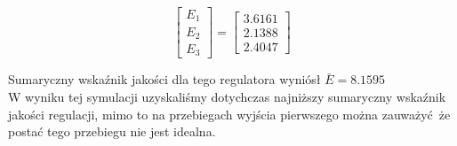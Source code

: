 \[
\begin{bmatrix}
    E_{\mathrm{1}} \\
    E_{\mathrm{2}} \\
    E_{\mathrm{3}} 
\end{bmatrix}
= 
\begin{bmatrix}
    \num{3.6161} \\
    \num{2.1388} \\
    \num{2.4047}
\end{bmatrix}
\]

Sumaryczny wskaźnik jakości dla tego regulatora wyniósł $\bar{E} = \num{8.1595}$\\

W wyniku tej symulacji uzyskaliśmy dotychczas najniższy sumaryczny wskaźnik jakości regulacji, 
mimo to na przebiegach wyjścia pierwszego można zauważyć że postać tego przebiegu nie jest 
idealna. 


